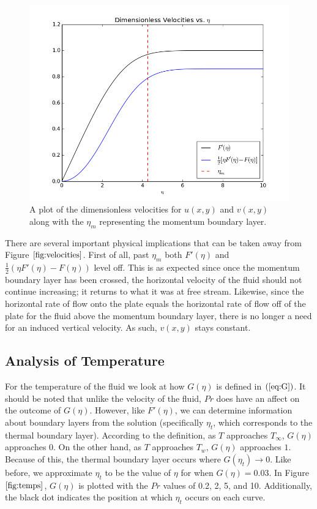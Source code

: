 \documentclass[12pt]{article}\pagestyle{myheadings}
\theoremstyle{plain}
\begin{document}
\begin{figure}[ht!]
\centering
\includegraphics[scale=0.75]{dimvel.png}
\caption{A plot of the dimensionless velocities for $u(x,y)$ and $v(x,y)$ along with the $\eta_{m}$ representing the momentum boundary layer.}
\label{fig:velocities}
\end{figure}

There are several important physical implications that can be taken away from Figure $\ref{fig:velocities}$. First of all, past $\eta_{m}$ both $F'(\eta)$ and $\frac{1}{2}(\eta F'(\eta) - F(\eta))$ level off. This is as expected since once the momentum boundary layer has been crossed, the horizontal velocity of the fluid should not continue increasing; it returns to what it was at free stream. Likewise, since the horizontal rate of flow onto the plate equals the horizontal rate of flow off of the plate for the fluid above the momentum boundary layer, there is no longer a need for an induced vertical velocity. As such, $v(x,y)$ stays constant.

\subsection{Analysis of Temperature}
For the temperature of the fluid we look at how $G(\eta)$ is defined in $(\ref{eq:G})$. It should be noted that unlike the velocity of the fluid, $Pr$ does have an affect on the outcome of $G(\eta)$. However, like $F'(\eta)$, we can determine information about boundary layers from the solution (specifically $\eta_{t}$, which corresponds to the thermal boundary layer). According to the definition, as $T$ approaches $T_{\infty}$, $G(\eta)$ approaches $0$. On the other hand, as $T$ approaches $T_{w}$, $G(\eta)$ approaches $1$. Because of this, the thermal boundary layer occurs where $G(\eta_{t}) \rightarrow 0$. Like before, we approximate $\eta_{t}$ to be the value of $\eta$ for when $G(\eta) = 0.03$. In Figure $\ref{fig:temps}$, $G(\eta)$ is plotted with the $Pr$ values of 0.2, 2, 5, and 10. Additionally, the black dot indicates the position at which $\eta_{t}$ occurs on each curve.
\end{document}
